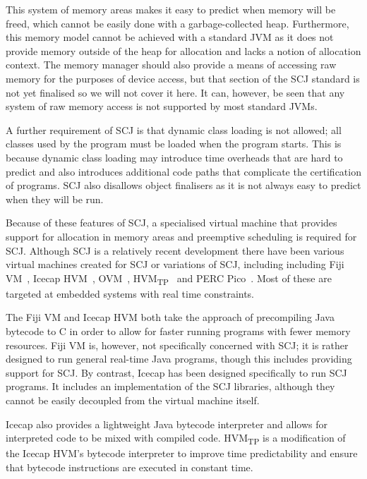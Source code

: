 \documentclass[a4paper,10pt]{article}
\begin{document}
This system of memory areas makes it easy to predict when memory will be freed,
which cannot be easily done with a garbage-collected heap.  Furthermore, this
memory model cannot be achieved with a standard JVM as it does not provide
memory outside of the heap for allocation and lacks a notion of allocation
context. The memory manager should also provide a means of accessing raw memory
for the purposes of device access, but that section of the SCJ standard is not
yet finalised so we will not cover it here. It can, however, be seen that any
system of raw memory access is not supported by most standard JVMs.

A further requirement of SCJ is that dynamic class loading is not allowed; all
classes used by the program must be loaded when the program starts. This is
because dynamic class loading may introduce time overheads that are hard to
predict and also introduces additional code paths that complicate the
certification of programs.  SCJ also disallows object finalisers as it is not
always easy to predict when they will be run.

Because of these features of SCJ, a specialised virtual machine that provides
support for allocation in memory areas and preemptive scheduling is required for
SCJ. Although SCJ is a relatively recent development there have been various
virtual machines created for SCJ or variations of SCJ, including including Fiji
VM~\cite{pizlo2009}, Icecap HVM~\cite{sondergaard2012},
OVM~\cite{armbruster2007}, HVM\textsubscript{TP}~\cite{luckow2014} and PERC
Pico~\cite{atego2015, richard2010}. Most of these are targeted at embedded
systems with real time constraints.

The Fiji VM and Icecap HVM both take the approach of precompiling Java
bytecode to C in order to allow for faster running programs with fewer
memory resources.  Fiji VM is, however, not specifically concerned
with SCJ; it is rather designed to run general real-time Java
programs, though this includes providing support for SCJ.  By
contrast, Icecap has been designed specifically to run SCJ
programs. It includes an implementation of the SCJ libraries, although
they cannot be easily decoupled from the virtual machine itself.

Icecap also provides a lightweight Java bytecode interpreter and
allows for interpreted code to be mixed with compiled
code. HVM\textsubscript{TP} is a modification of the Icecap HVM's
bytecode interpreter to improve time predictability and ensure that
bytecode instructions are executed in constant time.
\end{document}
